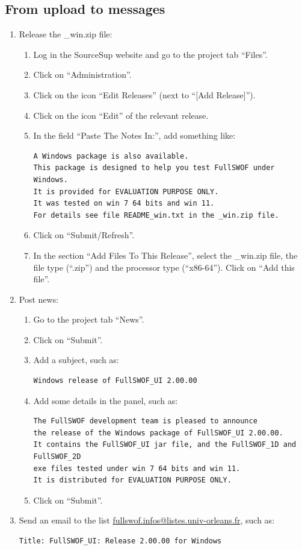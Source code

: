 \documentclass[a4paper, 11pt]{article}
\begin{document}
\subsection{From upload to messages}
\begin{enumerate}
\item Release the \_win.zip file:
\begin{enumerate}
\item Log in the SourceSup website and go to the project tab ``Files''.
\item Click on ``Administration''.
\item Click on the icon ``Edit Releases'' (next to ``[Add Release]'').
\item Click on the icon ``Edit'' of the relevant release.
\item In the field ``Paste The Notes In:'', add something like:
\begin{verbatim}
A Windows package is also available.
This package is designed to help you test FullSWOF under Windows.
It is provided for EVALUATION PURPOSE ONLY.
It was tested on win 7 64 bits and win 11.
For details see file README_win.txt in the _win.zip file.
\end{verbatim}
\item Click on ``Submit/Refresh''.
\item In the section ``Add Files To This Release'', select the \_win.zip file,
the file type (``.zip'') and the processor type  (``x86-64''). Click on ``Add this file''.
\end{enumerate}
\item Post news:
\begin{enumerate}
\item Go to the project tab ``News''.
\item Click on ``Submit''.
\item Add a subject, such as:
\begin{verbatim}
Windows release of FullSWOF_UI 2.00.00
\end{verbatim}
\item Add some details in the panel, such as:
\begin{verbatim}
The FullSWOF development team is pleased to announce
the release of the Windows package of FullSWOF_UI 2.00.00.
It contains the FullSWOF_UI jar file, and the FullSWOF_1D and FullSWOF_2D 
exe files tested under win 7 64 bits and win 11.
It is distributed for EVALUATION PURPOSE ONLY.
\end{verbatim}
\item Click on ``Submit''.
\end{enumerate}
\item Send an email to the list
\href{mailto:fullswof.infos@listes.univ-orleans.fr}{fullswof.infos@listes.univ-orleans.fr}, such as:
\begin{verbatim}
Title: FullSWOF_UI: Release 2.00.00 for Windows


\end{verbatim}
\end{enumerate}
\end{document}
